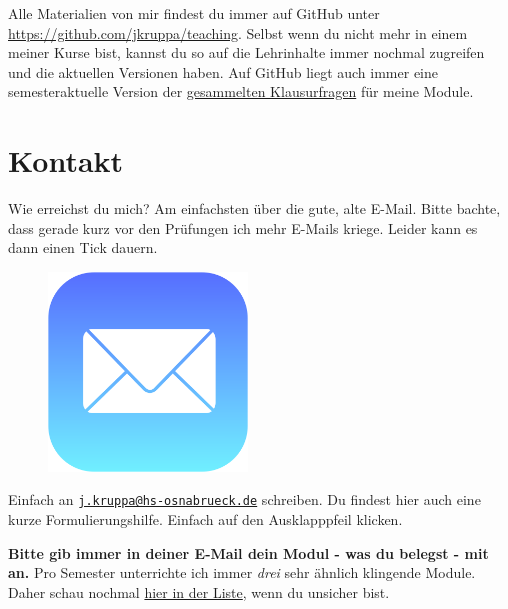 \documentclass[
  letterpaper,
  DIV=11,
  oneside]{scrreport}
\begin{document}
Alle Materialien von mir findest du immer auf GitHub unter
\url{https://github.com/jkruppa/teaching}. Selbst wenn du nicht mehr in
einem meiner Kurse bist, kannst du so auf die Lehrinhalte immer nochmal
zugreifen und die aktuellen Versionen haben. Auf GitHub liegt auch immer
eine semesteraktuelle Version der
\href{https://github.com/jkruppa/teaching/tree/main/Klausur}{gesammelten
Klausurfragen} für meine Module.

\hypertarget{sec-contact-mail}{%
\section*{Kontakt}\label{sec-contact-mail}}

Wie erreichst du mich? Am einfachsten über die gute, alte E-Mail. Bitte
bachte, dass gerade kurz vor den Prüfungen ich mehr E-Mails kriege.
Leider kann es dann einen Tick dauern.

\begin{figure}

{\centering \includegraphics[width=2.08333in,height=\textheight]{./images/mail.png}

}

\end{figure}

Einfach an
\href{mailto:j.kruppa@hs-osnabrueck.de}{\nolinkurl{j.kruppa@hs-osnabrueck.de}}
schreiben. Du findest hier auch eine kurze Formulierungshilfe. Einfach
auf den Ausklapppfeil klicken.

\textbf{Bitte gib immer in deiner E-Mail dein Modul - was du belegst -
mit an.} Pro Semester unterrichte ich immer \emph{drei} sehr ähnlich
klingende Module. Daher schau nochmal
\protect\hyperlink{sec-vorlesungen-hs}{hier in der Liste}, wenn du
unsicher bist.
\end{document}
